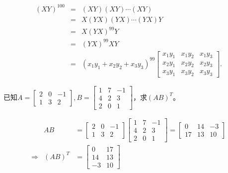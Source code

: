 \begin{solution}
\begin{eqnarray*}
(XY)^{100} & = & (XY)(XY)\cdots (XY) \\
& = & X(YX)(YX)\cdots (YX)Y \\
& = & X(YX)^{99}Y \\
& = & (YX)^{99}XY \\
& = & (x_1y_1 + x_2y_2 + x_3y_3)^{99} \begin{bmatrix} x_1y_1 & x_1y_2 & x_1y_3 \\ x_2y_1 & x_2y_2 & x_2y_3 \\ x_3y_1 & x_3y_2 & x_3y_3 \end{bmatrix}.
\end{eqnarray*}
\end{solution}

\begin{eg}
已知$A = \begin{bmatrix} 2 & 0 & -1 \\ 1 & 3 & 2 \end{bmatrix}, B = \begin{bmatrix} 1 & 7 & -1 \\ 4 & 2 & 3 \\ 2 & 0 & 1 \end{bmatrix}$，求$(AB)^T$。
\end{eg}

\begin{solution}[解法一]
\begin{eqnarray*}
& AB & = \begin{bmatrix} 2 & 0 & -1 \\ 1 & 3 & 2 \end{bmatrix} \begin{bmatrix} 1 & 7 & -1 \\ 4 & 2 & 3 \\ 2 & 0 & 1 \end{bmatrix} = \begin{bmatrix} 0 & 14 & -3 \\ 17 & 13 & 10 \end{bmatrix}\\
\Longrightarrow & (AB)^T & = \begin{bmatrix} 0 & 17 \\ 14 & 13 \\ -3 & 10 \end{bmatrix}
\end{eqnarray*}
\end{solution}

